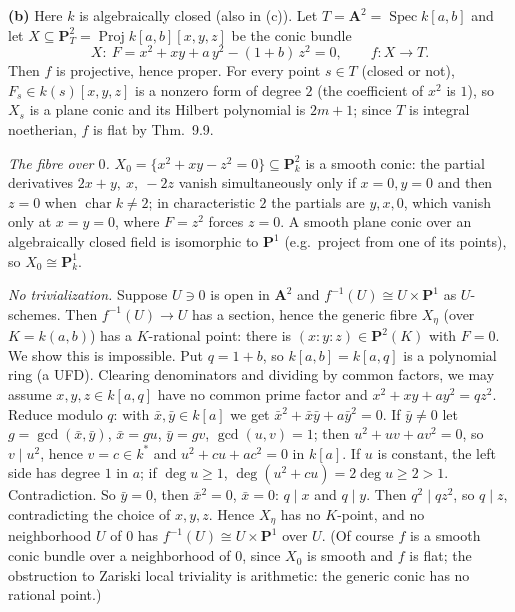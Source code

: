 \documentclass[11pt]{article}
\begin{document}
\textbf{(b)} Here $k$ is algebraically closed (also in (c)). Let $T=\mathbf A^2=\operatorname{Spec}k[a,b]$ and let $X\subseteq\mathbf P^2_T=\operatorname{Proj}k[a,b][x,y,z]$ be the conic bundle
\[
X:\ F=x^2+xy+a\,y^2-(1+b)\,z^2=0 ,\qquad f:X\to T .
\]
Then $f$ is projective, hence proper. For every point $s\in T$ (closed or not), $F_s\in k(s)[x,y,z]$ is a nonzero form of degree $2$ (the coefficient of $x^2$ is $1$), so $X_s$ is a plane conic and its Hilbert polynomial is $2m+1$; since $T$ is integral noetherian, $f$ is flat by Thm.~9.9.

\emph{The fibre over $0$.} $X_0=\{x^2+xy-z^2=0\}\subseteq\mathbf P^2_k$ is a smooth conic: the partial derivatives $2x+y,\ x,\ -2z$ vanish simultaneously only if $x=0,y=0$ and then $z=0$ when $\operatorname{char}k\ne2$; in characteristic $2$ the partials are $y,x,0$, which vanish only at $x=y=0$, where $F=z^2$ forces $z=0$. A smooth plane conic over an algebraically closed field is isomorphic to $\mathbf P^1$ (e.g.\ project from one of its points), so $X_0\cong\mathbf P^1_k$.

\emph{No trivialization.} Suppose $U\ni0$ is open in $\mathbf A^2$ and $f^{-1}(U)\cong U\times\mathbf P^1$ as $U$-schemes. Then $f^{-1}(U)\to U$ has a section, hence the generic fibre $X_\eta$ (over $K=k(a,b)$) has a $K$-rational point: there is $(x:y:z)\in\mathbf P^2(K)$ with $F=0$. We show this is impossible. Put $q=1+b$, so $k[a,b]=k[a,q]$ is a polynomial ring (a UFD). Clearing denominators and dividing by common factors, we may assume $x,y,z\in k[a,q]$ have no common prime factor and $x^2+xy+ay^2=qz^2$. Reduce modulo $q$: with $\bar x,\bar y\in k[a]$ we get $\bar x^2+\bar x\bar y+a\bar y^2=0$. If $\bar y\ne0$ let $g=\gcd(\bar x,\bar y)$, $\bar x=gu$, $\bar y=gv$, $\gcd(u,v)=1$; then $u^2+uv+av^2=0$, so $v\mid u^2$, hence $v=c\in k^*$ and $u^2+cu+ac^2=0$ in $k[a]$. If $u$ is constant, the left side has degree $1$ in $a$; if $\deg u\ge1$, $\deg(u^2+cu)=2\deg u\ge2>1$. Contradiction. So $\bar y=0$, then $\bar x^2=0$, $\bar x=0$: $q\mid x$ and $q\mid y$. Then $q^2\mid qz^2$, so $q\mid z$, contradicting the choice of $x,y,z$. Hence $X_\eta$ has no $K$-point, and no neighborhood $U$ of $0$ has $f^{-1}(U)\cong U\times\mathbf P^1$ over $U$. (Of course $f$ is a smooth conic bundle over a neighborhood of $0$, since $X_0$ is smooth and $f$ is flat; the obstruction to Zariski local triviality is arithmetic: the generic conic has no rational point.)
\end{document}
